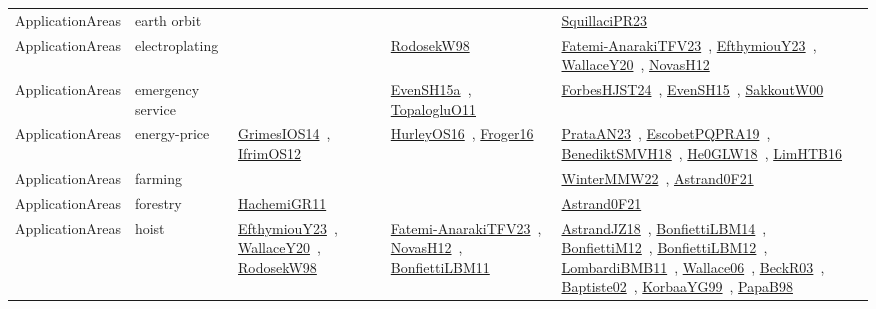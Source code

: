 {\begin{longtable}{lp{3cm}>{\raggedright\arraybackslash}p{6cm}>{\raggedright\arraybackslash}p{6cm}>{\raggedright\arraybackslash}p{8cm}}
ApplicationAreas & earth orbit &  &  & \href{works/SquillaciPR23.pdf}{SquillaciPR23}~\cite{SquillaciPR23}\\
ApplicationAreas & electroplating &  & \href{works/RodosekW98.pdf}{RodosekW98}~\cite{RodosekW98} & \href{works/Fatemi-AnarakiTFV23.pdf}{Fatemi-AnarakiTFV23}~\cite{Fatemi-AnarakiTFV23}, \href{works/EfthymiouY23.pdf}{EfthymiouY23}~\cite{EfthymiouY23}, \href{works/WallaceY20.pdf}{WallaceY20}~\cite{WallaceY20}, \href{works/NovasH12.pdf}{NovasH12}~\cite{NovasH12}\\
ApplicationAreas & emergency service &  & \href{works/EvenSH15a.pdf}{EvenSH15a}~\cite{EvenSH15a}, \href{works/TopalogluO11.pdf}{TopalogluO11}~\cite{TopalogluO11} & \href{works/ForbesHJST24.pdf}{ForbesHJST24}~\cite{ForbesHJST24}, \href{works/EvenSH15.pdf}{EvenSH15}~\cite{EvenSH15}, \href{works/SakkoutW00.pdf}{SakkoutW00}~\cite{SakkoutW00}\\
ApplicationAreas & energy-price & \href{works/GrimesIOS14.pdf}{GrimesIOS14}~\cite{GrimesIOS14}, \href{works/IfrimOS12.pdf}{IfrimOS12}~\cite{IfrimOS12} & \href{works/HurleyOS16.pdf}{HurleyOS16}~\cite{HurleyOS16}, \href{works/Froger16.pdf}{Froger16}~\cite{Froger16} & \href{works/PrataAN23.pdf}{PrataAN23}~\cite{PrataAN23}, \href{works/EscobetPQPRA19.pdf}{EscobetPQPRA19}~\cite{EscobetPQPRA19}, \href{works/BenediktSMVH18.pdf}{BenediktSMVH18}~\cite{BenediktSMVH18}, \href{works/He0GLW18.pdf}{He0GLW18}~\cite{He0GLW18}, \href{works/LimHTB16.pdf}{LimHTB16}~\cite{LimHTB16}\\
ApplicationAreas & farming &  &  & \href{works/WinterMMW22.pdf}{WinterMMW22}~\cite{WinterMMW22}, \href{works/Astrand0F21.pdf}{Astrand0F21}~\cite{Astrand0F21}\\
ApplicationAreas & forestry & \href{works/HachemiGR11.pdf}{HachemiGR11}~\cite{HachemiGR11} &  & \href{works/Astrand0F21.pdf}{Astrand0F21}~\cite{Astrand0F21}\\
ApplicationAreas & hoist & \href{works/EfthymiouY23.pdf}{EfthymiouY23}~\cite{EfthymiouY23}, \href{works/WallaceY20.pdf}{WallaceY20}~\cite{WallaceY20}, \href{works/RodosekW98.pdf}{RodosekW98}~\cite{RodosekW98} & \href{works/Fatemi-AnarakiTFV23.pdf}{Fatemi-AnarakiTFV23}~\cite{Fatemi-AnarakiTFV23}, \href{works/NovasH12.pdf}{NovasH12}~\cite{NovasH12}, \href{works/BonfiettiLBM11.pdf}{BonfiettiLBM11}~\cite{BonfiettiLBM11} & \href{works/AstrandJZ18.pdf}{AstrandJZ18}~\cite{AstrandJZ18}, \href{works/BonfiettiLBM14.pdf}{BonfiettiLBM14}~\cite{BonfiettiLBM14}, \href{works/BonfiettiM12.pdf}{BonfiettiM12}~\cite{BonfiettiM12}, \href{works/BonfiettiLBM12.pdf}{BonfiettiLBM12}~\cite{BonfiettiLBM12}, \href{works/LombardiBMB11.pdf}{LombardiBMB11}~\cite{LombardiBMB11}, \href{works/Wallace06.pdf}{Wallace06}~\cite{Wallace06}, \href{works/BeckR03.pdf}{BeckR03}~\cite{BeckR03}, \href{works/Baptiste02.pdf}{Baptiste02}~\cite{Baptiste02}, \href{works/KorbaaYG99.pdf}{KorbaaYG99}~\cite{KorbaaYG99}, \href{works/PapaB98.pdf}{PapaB98}~\cite{PapaB98}\\

\end{longtable}}
